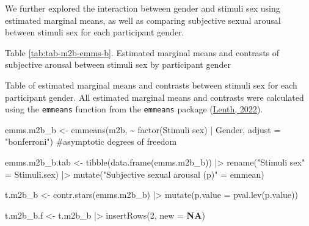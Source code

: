 \documentclass[
  bookmarksnumbered]{article}
\newenvironment{Shaded}{\begin{snugshade}}{\end{snugshade}}
\newcommand{\AttributeTok}[1]{\textcolor[rgb]{0.80,0.80,0.80}{#1}}
\newcommand{\CommentTok}[1]{\textcolor[rgb]{0.50,0.62,0.50}{#1}}
\newcommand{\ConstantTok}[1]{\textcolor[rgb]{0.86,0.64,0.64}{\textbf{#1}}}
\newcommand{\DecValTok}[1]{\textcolor[rgb]{0.86,0.86,0.80}{#1}}
\newcommand{\FunctionTok}[1]{\textcolor[rgb]{0.94,0.94,0.56}{#1}}
\newcommand{\NormalTok}[1]{\textcolor[rgb]{0.80,0.80,0.80}{#1}}
\newcommand{\OtherTok}[1]{\textcolor[rgb]{0.94,0.94,0.56}{#1}}
\newcommand{\SpecialCharTok}[1]{\textcolor[rgb]{0.86,0.64,0.64}{#1}}
\newcommand{\StringTok}[1]{\textcolor[rgb]{0.80,0.58,0.58}{#1}}
\begin{document}
We further explored the interaction between gender and stimuli sex using estimated marginal means, as well as comparing subjective sexual arousal between stimuli sex for each participant gender.

Table \ref{tab:tab-m2b-emms-b}. Estimated marginal means and contrasts of subjective arousal between stimuli sex by participant gender

Table of estimated marginal means and contrasts between stimuli sex for each participant gender. All estimated marginal means and contrasts were calculated using the \texttt{emmeans} function from the \texttt{emmeans} package (\protect\hyperlink{ref-emmeanscit}{Lenth, 2022}).

\begin{Shaded}
\begin{Highlighting}[]
\NormalTok{emms.m2b\_b }\OtherTok{\textless{}{-}} \FunctionTok{emmeans}\NormalTok{(m2b, }\SpecialCharTok{\textasciitilde{}} \FunctionTok{factor}\NormalTok{(}\StringTok{\textasciigrave{}}\AttributeTok{Stimuli sex}\StringTok{\textasciigrave{}}\NormalTok{) }\SpecialCharTok{|}\NormalTok{ Gender,}
                    \AttributeTok{adjust =} \StringTok{"bonferroni"}\NormalTok{) }\CommentTok{\#asymptotic degrees of freedom}

\NormalTok{emms.m2b\_b.tab }\OtherTok{\textless{}{-}} \FunctionTok{tibble}\NormalTok{(}\FunctionTok{data.frame}\NormalTok{(emms.m2b\_b)) }\SpecialCharTok{|\textgreater{}}
  \FunctionTok{rename}\NormalTok{(}\StringTok{"Stimuli sex"} \OtherTok{=}\NormalTok{ Stimuli.sex) }\SpecialCharTok{|\textgreater{}} 
  \FunctionTok{mutate}\NormalTok{(}\StringTok{"Subjective sexual arousal (p)"} \OtherTok{=}\NormalTok{ emmean)}

\NormalTok{t.m2b\_b }\OtherTok{\textless{}{-}} \FunctionTok{contr.stars}\NormalTok{(emms.m2b\_b) }\SpecialCharTok{|\textgreater{}} 
  \FunctionTok{mutate}\NormalTok{(}\AttributeTok{p.value =} \FunctionTok{pval.lev}\NormalTok{(p.value))}

\NormalTok{t.m2b\_b.f }\OtherTok{\textless{}{-}}\NormalTok{ t.m2b\_b }\SpecialCharTok{|\textgreater{}} 
  \FunctionTok{insertRows}\NormalTok{(}\DecValTok{2}\NormalTok{, }\AttributeTok{new =} \ConstantTok{NA}\NormalTok{)}


\end{Highlighting}
\end{Shaded}
\end{document}
